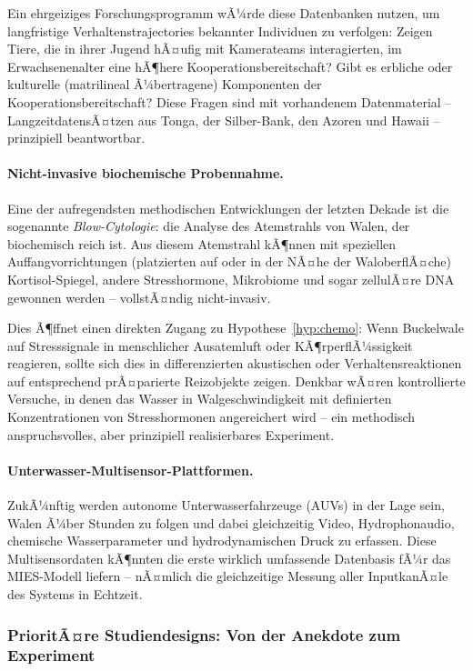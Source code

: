 ﻿\documentclass[12pt,a4paper]{article}
\theoremstyle{definition}
\theoremstyle{remark}
\begin{document}
Ein ehrgeiziges Forschungsprogramm wÃ¼rde diese Datenbanken nutzen, um langfristige Verhaltenstrajectories bekannter Individuen zu verfolgen: Zeigen Tiere, die in ihrer Jugend hÃ¤ufig mit Kamerateams interagierten, im Erwachsenenalter eine hÃ¶here Kooperationsbereitschaft? Gibt es erbliche oder kulturelle (matrilineal Ã¼bertragene) Komponenten der Kooperationsbereitschaft? Diese Fragen sind mit vorhandenem Datenmaterial -- LangzeitdatensÃ¤tzen aus Tonga, der Silber-Bank, den Azoren und Hawaii -- prinzipiell beantwortbar.

\paragraph{Nicht-invasive biochemische Probennahme.}
Eine der aufregendsten methodischen Entwicklungen der letzten Dekade ist die sogenannte \emph{Blow-Cytologie}: die Analyse des Atemstrahls von Walen, der biochemisch reich ist. Aus diesem Atemstrahl kÃ¶nnen mit speziellen Auffangvorrichtungen (platzierten auf oder in der NÃ¤he der WaloberflÃ¤che) Kortisol-Spiegel, andere Stresshormone, Mikrobiome und sogar zellulÃ¤re DNA gewonnen werden -- vollstÃ¤ndig nicht-invasiv.

Dies Ã¶ffnet einen direkten Zugang zu Hypothese~\ref{hyp:chemo}: Wenn Buckelwale auf Stresssignale in menschlicher Ausatemluft oder KÃ¶rperflÃ¼ssigkeit reagieren, sollte sich dies in differenzierten akustischen oder Verhaltensreaktionen auf entsprechend prÃ¤parierte Reizobjekte zeigen. Denkbar wÃ¤ren kontrollierte Versuche, in denen das Wasser in Walgeschwindigkeit mit definierten Konzentrationen von Stresshormonen angereichert wird -- ein methodisch anspruchsvolles, aber prinzipiell realisierbares Experiment.

\paragraph{Unterwasser-Multisensor-Plattformen.}
ZukÃ¼nftig werden autonome Unterwasserfahrzeuge (AUVs) in der Lage sein, Walen Ã¼ber Stunden zu folgen und dabei gleichzeitig Video, Hydrophonaudio, chemische Wasserparameter und hydrodynamischen Druck zu erfassen. Diese Multisensordaten kÃ¶nnten die erste wirklich umfassende Datenbasis fÃ¼r das MIES-Modell liefern -- nÃ¤mlich die gleichzeitige Messung aller InputkanÃ¤le des Systems in Echtzeit.

\subsubsection{PrioritÃ¤re Studiendesigns: Von der Anekdote zum Experiment}
\end{document}
